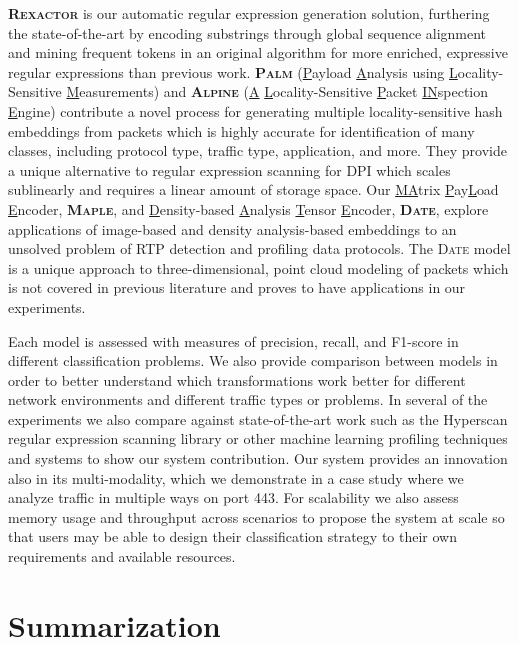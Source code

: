 \textbf{\textsc{Rexactor}} is our automatic regular expression generation solution, furthering the state-of-the-art by encoding substrings through global sequence alignment and mining frequent tokens in an original algorithm for more enriched, expressive regular expressions than previous work. \textbf{\textsc{Palm}} (\underline{P}ayload \underline{A}nalysis using \underline{L}ocality-Sensitive \underline{M}easurements) and \textbf{\textsc{Alpine}} (\underline{A} \underline{L}ocality-Sensitive \underline{P}acket \underline{IN}spection \underline{E}ngine) contribute a novel process for generating multiple locality-sensitive hash embeddings from packets which is highly accurate for identification of many classes, including protocol type, traffic type, application, and more. They provide a unique alternative to regular expression scanning for DPI which scales sublinearly and requires a linear amount of storage space. Our \underline{MA}trix \underline{P}ay\underline{L}oad \underline{E}ncoder, \textbf{\textsc{Maple}}, and \underline{D}ensity-based \underline{A}nalysis \underline{T}ensor \underline{E}ncoder, \textbf{\textsc{Date}}, explore applications of image-based and density analysis-based embeddings to an unsolved problem of RTP detection and profiling data protocols. The \textsc{Date} model is a unique approach to three-dimensional, point cloud modeling of packets which is not covered in previous literature and proves to have applications in our experiments.

Each model is assessed with measures of precision, recall, and F1-score in different classification problems. We also provide comparison between models in order to better understand which transformations work better for different network environments and different traffic types or problems. In several of the experiments we also compare against state-of-the-art work such as the Hyperscan regular expression scanning library or other machine learning profiling techniques and systems to show our system contribution. Our system provides an innovation also in its multi-modality, which we demonstrate in a case study where we analyze traffic in multiple ways on port 443. For scalability we also assess memory usage and throughput across scenarios to propose the system at scale so that users may be able to design their classification strategy to their own requirements and available resources.

\section{Summarization}

